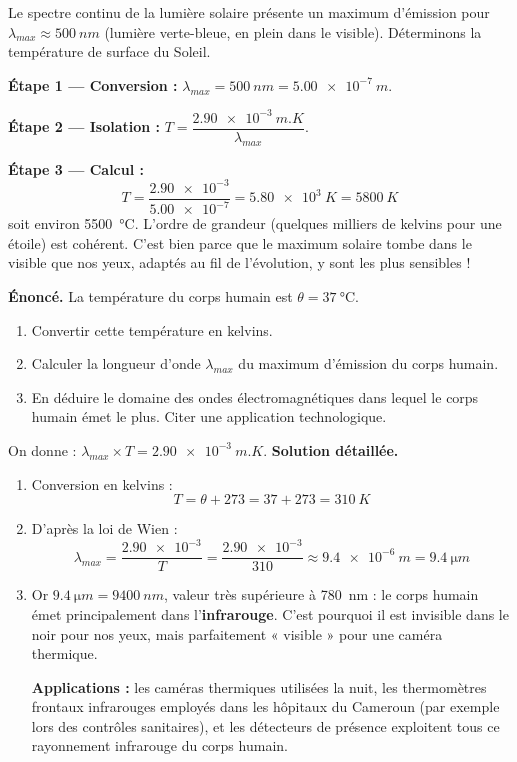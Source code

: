 \documentclass[11pt]{article}
\begin{document}
\begin{exemplebox}
Le spectre continu de la lumière solaire présente un maximum d'émission pour $\lambda_{max} \approx \SI{500}{nm}$ (lumière verte-bleue, en plein dans le visible). Déterminons la température de surface du Soleil.

\textbf{Étape 1 — Conversion :} $\lambda_{max} = \SI{500}{nm} = \num{5,00e-7}\ \si{m}$.

\textbf{Étape 2 — Isolation :} $T = \dfrac{\num{2,90e-3}\ \si{m.K}}{\lambda_{max}}$.

\textbf{Étape 3 — Calcul :}
\[ T = \frac{\num{2,90e-3}}{\num{5,00e-7}} = \num{5,80e3}\ \si{K} = \SI{5800}{K} \]
soit environ \SI{5500}{\celsius}. L'ordre de grandeur (quelques milliers de kelvins pour une étoile) est cohérent. C'est bien parce que le maximum solaire tombe dans le visible que nos yeux, adaptés au fil de l'évolution, y sont les plus sensibles !
\end{exemplebox}

\begin{exoresolu}
\textbf{Énoncé.} La température du corps humain est $\theta = \SI{37}{\celsius}$.
\begin{enumerate}
\item Convertir cette température en kelvins.
\item Calculer la longueur d'onde $\lambda_{max}$ du maximum d'émission du corps humain.
\item En déduire le domaine des ondes électromagnétiques dans lequel le corps humain émet le plus. Citer une application technologique.
\end{enumerate}
On donne : $\lambda_{max} \times T = \num{2,90e-3}\ \si{m.K}$.
\tcblower
\textbf{Solution détaillée.}
\begin{enumerate}
\item Conversion en kelvins :
\[ T = \theta + 273 = 37 + 273 = \SI{310}{K} \]
\item D'après la loi de Wien :
\[ \lambda_{max} = \frac{\num{2,90e-3}}{T} = \frac{\num{2,90e-3}}{310} \approx \num{9,4e-6}\ \si{m} = \SI{9,4}{\micro m} \]
\item Or $\SI{9,4}{\micro m} = \SI{9400}{nm}$, valeur très supérieure à \SI{780}{nm} : le corps humain émet principalement dans l'\textbf{infrarouge}. C'est pourquoi il est invisible dans le noir pour nos yeux, mais parfaitement « visible » pour une caméra thermique.

\textbf{Applications :} les caméras thermiques utilisées la nuit, les thermomètres frontaux infrarouges employés dans les hôpitaux du Cameroun (par exemple lors des contrôles sanitaires), et les détecteurs de présence exploitent tous ce rayonnement infrarouge du corps humain.
\end{enumerate}
\end{exoresolu}
\end{document}
